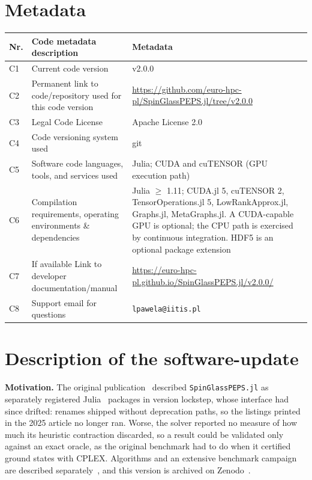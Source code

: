 \documentclass[preprint,12pt,a4paper]{elsarticle}
\begin{document}
\section*{Metadata}
\label{metadata}

\begin{table}[H]
\begin{tabular}{|l|>{\raggedright\arraybackslash}p{5.9cm}|>{\raggedright\arraybackslash}p{5.9cm}|}
\hline
Nr. & Code metadata description & Metadata \\
\hline
C1 & Current code version & v2.0.0 \\
\hline
C2 & Permanent link to code/repository used for this code version &
\url{https://github.com/euro-hpc-pl/SpinGlassPEPS.jl/tree/v2.0.0} \\
\hline
C3 & Legal Code License & Apache License 2.0 \\
\hline
C4 & Code versioning system used & git \\
\hline
C5 & Software code languages, tools, and services used & Julia; CUDA and
cuTENSOR (GPU execution path) \\
\hline
C6 & Compilation requirements, operating environments \& dependencies & Julia
$\geq$ 1.11; CUDA.jl 5, cuTENSOR 2, TensorOperations.jl 5, LowRankApprox.jl,
Graphs.jl, MetaGraphs.jl. A CUDA-capable GPU is optional; the CPU path is
exercised by continuous integration. HDF5 is an optional package extension \\
\hline
C7 & If available Link to developer documentation/manual &
\url{https://euro-hpc-pl.github.io/SpinGlassPEPS.jl/v2.0.0/} \\
\hline
C8 & Support email for questions & \texttt{lpawela@iitis.pl} \\
\hline
\end{tabular}
\end{table}

\linenumbers

\section{Description of the software-update}
\label{Description of the software-update}

\textbf{Motivation.} The original publication~\cite{smierzchalski2025spinglasspeps}
described \texttt{SpinGlassPEPS.jl} as separately registered
Julia~\cite{bezanson2017julia} packages in version lockstep, whose interface had
since drifted: renames shipped without deprecation paths, so the listings printed
in the 2025 article no longer ran. Worse, the solver reported no measure of how
much its heuristic contraction discarded, so a result could be validated only
against an exact oracle, as the original benchmark had to do when it certified
ground states with CPLEX. Algorithms and an extensive benchmark
campaign are described separately~\cite{dziubyna2024limitations}, and this version
is archived on Zenodo~\cite{spinglasspeps_zenodo}.
\end{document}
